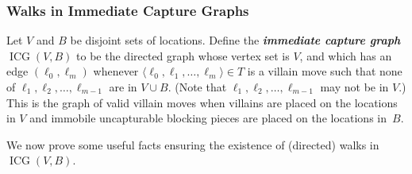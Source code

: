 \documentclass[11pt,letterpaper]{article}
\def\defn#1{\textbf{\textit{\boldmath #1}}}
\newcommand{\ICG}{\operatorname{ICG}}
\theoremstyle{plain}
\theoremstyle{definition}
\theoremstyle{remark}
\numberwithin{equation}{section}
\begin{document}
\subsubsection{Walks in Immediate Capture Graphs}

Let \(V\) and \(B\) be disjoint sets of locations.
Define the \defn{immediate capture graph \(\ICG(V, B)\)} to be
the directed graph whose vertex set is \(V\),
and which has an edge \((\ell_0, \ell_m)\) whenever
\(\langle \ell_0, \ell_1, \ldots, \ell_m \rangle \in T\)
is a villain move such that none of \(\ell_1, \ell_2, \ldots, \ell_{m-1}\) are in \(V \cup B\).
(Note that \(\ell_1, \ell_2, \ldots, \ell_{m-1}\) may not be in \(V\).)
This is the graph of valid villain moves when
villains are placed on the locations in \(V\)
and immobile uncapturable blocking pieces are placed on the locations in~\(B\).

We now prove some useful facts ensuring the existence of (directed) walks
in \(\ICG(V, B)\).
\end{document}
